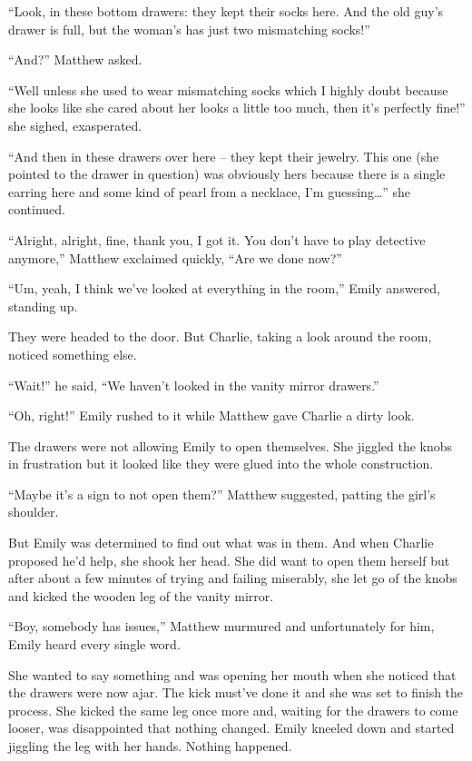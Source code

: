 “Look, in these bottom drawers: they kept their socks here. And the old guy's drawer is full, but the woman's has just two mismatching socks!”

“And?” Matthew asked.

“Well unless she used to wear mismatching socks which I highly doubt because she looks like she cared about her looks a little too much, then it's perfectly fine!” she sighed, exasperated.

“And then in these drawers over here – they kept their jewelry. This one (she pointed to the drawer in question) was obviously hers because there is a single earring here and some kind of pearl from a necklace, I'm guessing…” she continued.

“Alright, alright, fine, thank you, I got it. You don't have to play detective anymore,” Matthew exclaimed quickly, “Are we done now?”

“Um, yeah, I think we've looked at everything in the room,” Emily answered, standing up.

They were headed to the door. But Charlie, taking a look around the room, noticed something else.

“Wait!” he said, “We haven't looked in the vanity mirror drawers.”

“Oh, right!” Emily rushed to it while Matthew gave Charlie a dirty look.

The drawers were not allowing Emily to open themselves. She jiggled the knobs in frustration but it looked like they were glued into the whole construction.

“Maybe it's a sign to not open them?” Matthew suggested, patting the girl's shoulder.

But Emily was determined to find out what was in them. And when Charlie proposed he'd help, she shook her head. She did want to open them herself but after about a few minutes of trying and failing miserably, she let go of the knobs and kicked the wooden leg of the vanity mirror.

“Boy, somebody has issues,” Matthew murmured and unfortunately for him, Emily heard every single word.

She wanted to say something and was opening her mouth when she noticed that the drawers were now ajar. The kick must've done it and she was set to finish the process. She kicked the same leg once more and, waiting for the drawers to come looser, was disappointed that nothing changed. Emily kneeled down and started jiggling the leg with her hands. Nothing happened.

